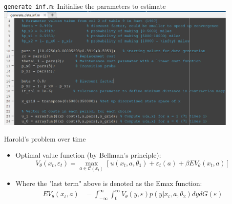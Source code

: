 \documentclass[aspectratio=169]{beamer}
\begin{document}
	\begin{frame}{\texttt{generate\_inf.m}: Initialise the parameters to estimate}
		\includegraphics[width=0.9\textwidth]{figs/1_setup.PNG}
	\end{frame}
	
	
	\begin{frame}{Harold's problem over time}\label{vf}
		\begin{itemize}
			\itemsep1em
			\item Optimal value function (by Bellman's principle): 
			\begin{equation}
				V_\theta(x_t,\varepsilon_t) = \max_{a \in \mathcal{C}(x_t)} [u(x_{t},a,\theta_1) + \varepsilon_t(a) + \beta EV_\theta(x_t,a)]
			\end{equation}
			\item Where the "last term" above is denoted as the Emax function:
			\begin{align}
				EV_\theta(x_t,a) &= \int_{-\infty}^\infty \int_0^\infty V_\theta(y,\varepsilon) p(y|x_t,a,\theta_2) dy dG(\varepsilon) \label{eq:emax_general}
			\end{align}
		\end{itemize}
	\end{frame}
	
	
	
\end{document}
